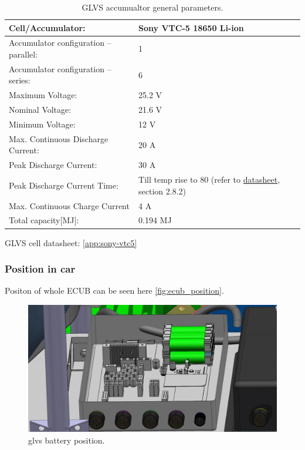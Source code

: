 \begin{table}[H]
	\centering
	\caption{GLVS accumualtor general parameters.}
	\begin{tabu}{|X|X|}\hline
		Cell/Accumulator: & Sony VTC-5 18650 Li-ion\\\hline
		Accumulator configuration – parallel: & 1 \\\hline
		Accumulator configuration – series: & 6 \\\hline
		Maximum Voltage: & 25.2 V \\\hline
		Nominal Voltage: & 21.6 V \\\hline
		Minimum Voltage: & 12 V \\\hline
		Max. Continuous Discharge Current: & 20 A \\\hline
		Peak Discharge Current: & 30 A \\\hline
		Peak Discharge Current Time: & Till temp rise to 80 \degC (refer to \hyperref[app:sony-vtc5]{datasheet}, section 2.8.2) \\\hline
		Max. Continuous Charge Current & 4 A\\\hline
		Total capacity[MJ]: & 0.194 MJ \\\hline
	\end{tabu}%
	\label{tab:LVbatt-general}%
\end{table}%

GLVS cell datasheet: \ref{app:sony-vtc5}

\subsubsection{Position in car}
Positon of whole ECUB can be seen here \ref{fig:ecub_position}.
\begin{figure}[H]
	\centering
	\includegraphics[width=\textwidth,clip]{./img/ECUB_BATTERY_POSITION.jpg}
	\caption{\gls{glvs} battery position.}
	\label{fig:GLVS_battery_position}
\end{figure}
